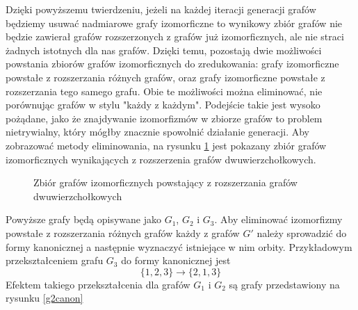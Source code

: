 Dzięki powyższemu twierdzeniu, jeżeli na każdej iteracji generacji grafów będziemy usuwać nadmiarowe grafy izomorficzne to wynikowy zbiór grafów nie będzie zawierał  grafów rozszerzonych z grafów już izomorficznych, ale nie straci żadnych istotnych dla nas grafów. Dzięki temu, pozostają dwie możliwości powstania zbiorów grafów izomorficznych do zredukowania: grafy izomorficzne powstałe z rozszerzania różnych grafów, oraz grafy izomorficzne powstałe z rozszerzania tego samego grafu. Obie te możliwości można eliminować, nie porównując grafów w stylu "każdy z każdym". Podejście takie jest wysoko pożądane, jako że znajdywanie izomorfizmów w zbiorze grafów to problem nietrywialny, który mógłby znacznie spowolnić działanie generacji. Aby zobrazować metody eliminowania, na rysunku \ref{rozszerzenieIzomorfizm1} jest pokazany zbiór grafów izomorficznych wynikających z rozszerzenia grafów dwuwierzchołkowych. 

\begin{figure}[H]
	\hfill
	\hfill
	\hfill
	\hfill
	\hfill
	\caption{Zbiór grafów izomorficznych powstający z rozszerzania grafów dwuwierzchołkowych}
	\label{rozszerzenieIzomorfizm1}
\end{figure} 
Powyższe grafy będą opisywane jako $G_1$, $G_2$ i $G_3$. Aby eliminować izomorfizmy powstałe z rozszerzania różnych grafów każdy z grafów $G'$ należy sprowadzić do formy kanonicznej a następnie wyznaczyć istniejące w nim orbity. Przykładowym przekształceniem grafu $G_3$ do formy kanonicznej jest 
$$ \{1,2,3\} \to \{2,1,3\} $$
Efektem takiego przekształcenia dla grafów $G_1$ i $G_2$ są grafy przedstawiony na rysunku \ref{g2canon}

